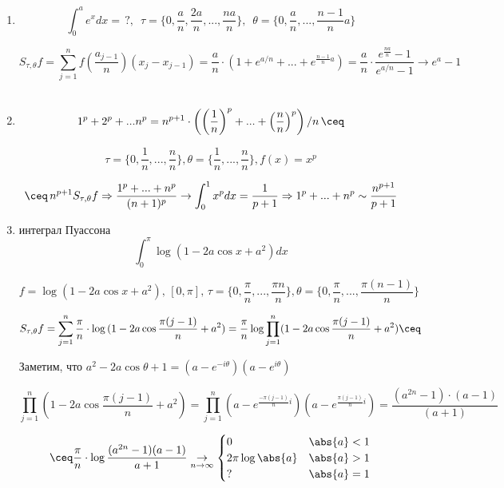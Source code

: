 \begin{example}
    \begin{enumerate}
        \item \[
            \int_0^{a} e^x dx = \,? , \,\,\, \tau = \{ 0, \frac{a}{n}, \frac{2a}{n}, ..., \frac{na}{n} \}, \,\,\, \theta = \{ 0, \frac{a}{n}, ... , \frac{n - 1}{n} a \}
        \]
    
        \[
            S_{\tau, \theta} f = \sum_{j = 1}^n f \left( \frac{a_{j - 1}}{n} \right)(x_j - x_{j - 1}) = \frac{a}{n} \cdot \left( 1 + e ^ {a / n} + ... + e ^{\frac{n - 1}{n} a} \right) = \frac{a}{n} \cdot \frac{e ^ {\frac{na}{n}} - 1}{e ^ {a / n} - 1} \to e^a - 1
        \]
        \\
        \item
        \[
            1 ^ p + 2 ^ p + ... n ^ p = n ^ {p + 1} \cdot \left( \left( \frac{1}{n} \right) ^ p + ... + \left( \frac{n}{n} \right) ^ p \right)/ n \, \ceq
        \]

        \[
            \tau = \{ 0, \frac{1}{n}, ... , \frac{n}{n} \}, \theta = \{\frac{1}{n}, ... , \frac{n}{n}  \}, f(x) = x ^ p
        \]

        \[
            \ceq \, n ^ {p + 1} S_{\tau, \theta} f \Rightarrow \frac{1 ^ p + ... + n ^ p}{(n + 1) ^ p} \to \int_0^1 x ^ p dx = \frac{1}{p + 1} \Rightarrow 1 ^ p + ... + n ^ p \sim \frac{n ^ {p + 1}}{p + 1}
        \]

        \item интеграл Пуассона
        \[
            \int_0^\pi \log{(1 - 2a \cos{x} + a ^ 2)} dx
        \]

        \[
            f = \log{(1 - 2a \cos{x} + a ^ 2)},\, [0, \pi],\, \tau = \{0, \frac{\pi}{n}, ... , \frac{\pi n}{n} \}, \theta = \{0, \frac{\pi}{n}, ... , \frac{\pi (n - 1)}{n} \}
        \]

        \[
            S_{\tau, \theta} f = \sum_{j = 1}^n \frac{\pi}{n} \cdot \log{(1 - 2a \cos{\frac{\pi (j - 1)}{n} + a ^ 2})} = \frac{\pi}{n} \log{\prod_{j = 1}^n (1 - 2a \cos{\frac{\pi (j - 1)}{n} + a ^ 2})} \ceq
        \]

        Заметим, что $a ^ 2 - 2a \cos{\theta} + 1 = (a - e ^ {-i \theta})(a - e ^ {i \theta})$

        \[
            \prod_{j = 1}^n (1 - 2a \cos{\frac{\pi (j - 1)}{n} + a ^ 2}) =  \prod_{j = 1}^n (a - e ^ {\frac{-\pi (j - 1)}{n} i })(a - e ^ {\frac{\pi (j - 1)}{n} i }) = \frac{(a ^ {2n} - 1) \cdot (a - 1)}{(a + 1)}
        \]

        \[
            \ceq \frac{\pi}{n} \cdot \log{\frac{(a ^ {2n} - 1)(a - 1)}{a + 1}} \underset{n \to \infty}{\to} \begin{cases}
                0 & \abs{a} < 1 \\
                2 \pi \log{\abs{a}} & \abs{a} > 1 \\
                ? & \abs{a} = 1
              \end{cases}
        \]
    \end{enumerate}
    
\end{example}



